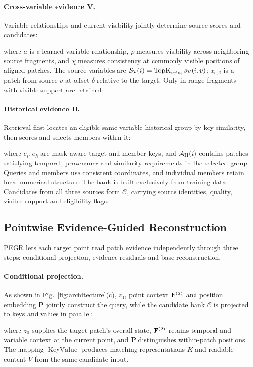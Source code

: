 \paragraph{Cross-variable evidence V.}
Variable relationships and current visibility jointly determine source scores and candidates:

where $a$ is a learned variable relationship, $\rho$ measures visibility across neighboring source fragments, and $\chi$ measures consistency at commonly visible positions of aligned patches. The source variables are $\mathcal S_{\rm V}(i)=\operatorname{TopK}_{v\ne c_i}s_{\rm V}(i,v)$; $x_{v,\delta}$ is a patch from source $v$ at offset $\delta$ relative to the target. Only in-range fragments with visible support are retained.

\paragraph{Historical evidence H.}
Retrieval first locates an eligible same-variable historical group by key similarity, then scores and selects members within it:

where $e_i,e_h$ are mask-aware target and member keys, and $\mathcal A_{\rm H}(i)$ contains patches satisfying temporal, provenance and similarity requirements in the selected group. Queries and members use consistent coordinates, and individual members retain local numerical structure. The bank is built exclusively from training data. Candidates from all three sources form $\mathcal C$, carrying source identities, quality, visible support and eligibility flags.

\subsection{Pointwise Evidence-Guided Reconstruction}\label{sec:pegr}
PEGR lets each target point read patch evidence independently through three steps: conditional projection, evidence residuals and base reconstruction.

\paragraph{Conditional projection.}
As shown in Fig.~\ref{fig:architecture}(c), $z_0$, point context $\mathbf{F}^{(2)}$ and position embedding $\mathbf P$ jointly construct the query, while the candidate bank $\mathcal C$ is projected to keys and values in parallel:

where $z_0$ supplies the target patch's overall state, $\mathbf{F}^{(2)}$ retains temporal and variable context at the current point, and $\mathbf P$ distinguishes within-patch positions. The mapping $\operatorname{KeyValue}$ produces matching representations $K$ and readable content $V$ from the same candidate input.

